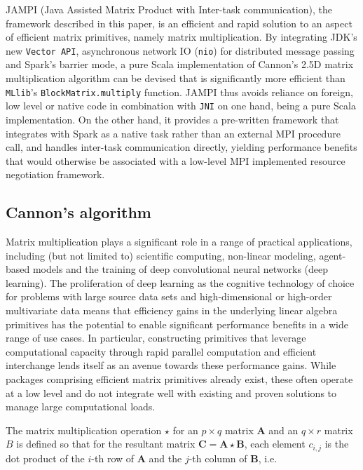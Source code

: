 \documentclass[fleqn,10pt]{SelfArx} %
\begin{document}
JAMPI (Java Assisted Matrix Product with Inter-task communication), the framework described in this paper, is an efficient and rapid solution to an aspect of efficient matrix primitives, namely matrix multiplication. By integrating JDK's new \texttt{Vector API}, asynchronous network IO (\texttt{nio}) for distributed message passing and Spark's barrier mode, a pure Scala implementation of Cannon's 2.5D matrix multiplication algorithm can be devised that is significantly more efficient than \texttt{MLlib}'s \texttt{BlockMatrix.multiply} function. JAMPI thus avoids reliance on foreign, low level or native code in combination with \texttt{JNI} on one hand, being a pure Scala implementation. On the other hand, it provides a pre-written framework that integrates with Spark as a native task rather than an external MPI procedure call, and handles inter-task communication directly, yielding performance benefits that would otherwise be associated with a low-level MPI implemented resource negotiation framework.

\subsection{Cannon's algorithm} %
\label{sub:cannon_s_algorithm}

Matrix multiplication plays a significant role in a range of practical applications, including (but not limited to) scientific computing, non-linear modeling, agent-based models and the training of deep convolutional neural networks (deep learning). The proliferation of deep learning as the cognitive technology of choice for problems with large source data sets and high-dimensional or high-order multivariate data means that efficiency gains in the underlying linear algebra primitives has the potential to enable significant performance benefits in a wide range of use cases. In particular, constructing primitives that leverage computational capacity through rapid parallel computation and efficient interchange lends itself as an avenue towards these performance gains. While packages comprising efficient matrix primitives already exist,\cite{chetlur2014cudnn} these often operate at a low level and do not integrate well with existing and proven solutions to manage large computational loads.


The matrix multiplication operation $\star$ for an $p \times q$ matrix $\mathbf{A}$ and an $q \times r$ matrix $B$ is defined so that for the resultant matrix $\mathbf{C} = \mathbf{A} \star \mathbf{B}$, each element $c_{i, j}$ is the dot product of the $i$-th row of $\mathbf{A}$ and the $j$-th column of $\mathbf{B}$, i.e.
\end{document}
